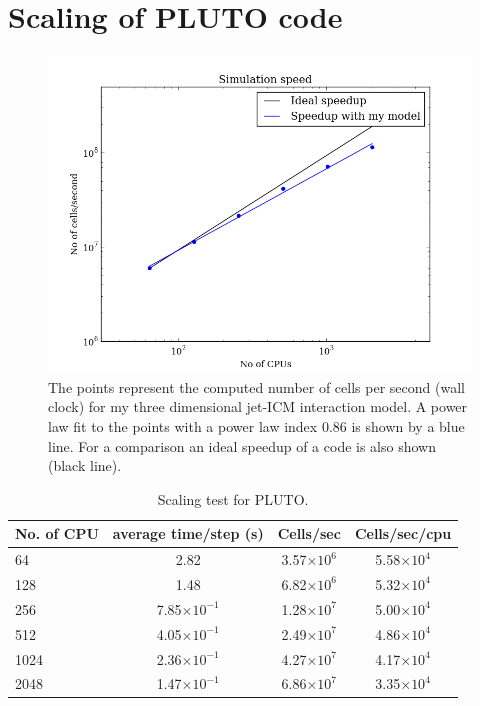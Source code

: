 \section{Scaling of PLUTO code}\label{s:pt}
\begin{figure}
\centering
\includegraphics[width=12cm]{ppt.png}
\caption{ The points represent the computed number of cells per second (wall clock) for my three dimensional jet-ICM interaction model. A power law fit to the points with a power law index 0.86 is shown by a blue line. For a comparison an ideal speedup of a code is also shown (black line). }
\label{f:ppt}
\end{figure}

\begin{table}
\caption{Scaling test for PLUTO.}
\centering
\begin{tabular}{l * {3}{c}}
\hline \hline
No. of CPU & average time/step (s) & Cells/sec & Cells/sec/cpu  \\
\hline 
	 64   & 2.82  &  3.57$\times10^6$ &   5.58$\times10^4$    \\
	 128 & 1.48  & 6.82$\times10^6$ &  5.32$\times10^4$ \\
	 256  & 7.85$\times10^{-1}$ & 1.28$\times10^7$  & 5.00$\times10^4$ \\
	 512  & 4.05$\times10^{-1}$ & 2.49$\times10^7$  & 4.86$\times10^4$ \\
	 1024 & 2.36$\times10^{-1}$ & 4.27$\times10^7$  & 4.17$\times10^4$ \\
	 2048  & 1.47$\times10^{-1}$ & 6.86$\times10^7$  & 3.35$\times10^4$ \\
	\hline
\end{tabular}
\label{t:pst}
\end{table}

